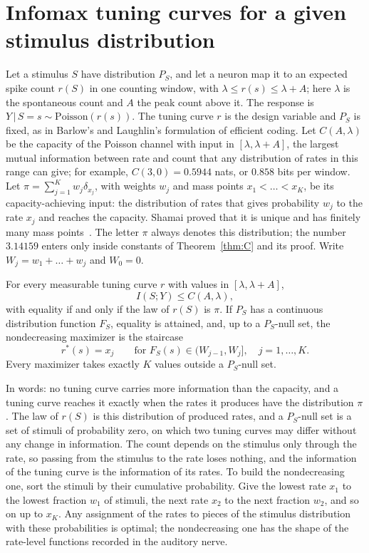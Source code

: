
\section{Infomax tuning curves for a given stimulus distribution}\label{sec:laughlin}

Let a stimulus $S$ have distribution $P_S$, and let a neuron map it to an expected spike count $r(S)$ in one counting window, with
$\lambda\le r(s)\le\lambda+A$; here $\lambda$ is the spontaneous count and $A$ the peak count above it. The response is
$Y\,|\,S=s\sim\mathrm{Poisson}(r(s))$. The tuning curve $r$ is the design variable and $P_S$ is fixed, as in Barlow's and Laughlin's
formulation of efficient coding. Let $C(A,\lambda)$ be the capacity of the Poisson channel with input in $[\lambda,\lambda+A]$, the
largest mutual information between rate and count that any distribution of rates in this range can give; for example,
$C(3,0)=0.5944$ nats, or $0.858$ bits per window. Let
$\pi=\sum_{j=1}^{K}w_j\delta_{x_j}$, with weights $w_j$ and mass points $x_1<\dots<x_K$, be its capacity-achieving input: the
distribution of rates that gives probability $w_j$ to the rate $x_j$ and reaches the capacity. Shamai proved that it is unique and has
finitely many mass points~\cite{Shamai1990}. The letter $\pi$ always denotes this distribution; the number $3.14159$ enters only
inside constants of Theorem~\ref{thm:C} and its proof. Write $W_j=w_1+\dots+w_j$ and $W_0=0$.

\begin{proposition}\label{prop:L1}
For every measurable tuning curve $r$ with values in $[\lambda,\lambda+A]$,
\[
I(S;Y)\le C(A,\lambda),
\]
with equality if and only if the law of $r(S)$ is $\pi$. If $P_S$ has a continuous distribution function $F_S$, equality is attained,
and, up to a $P_S$-null set, the nondecreasing maximizer is the staircase
\[
r^*(s)=x_j\qquad\text{for } F_S(s)\in(W_{j-1},W_j],\quad j=1,\dots,K .
\]
Every maximizer takes exactly $K$ values outside a $P_S$-null set.
\end{proposition}

In words: no tuning curve carries more information than the capacity, and a tuning curve reaches it exactly when the rates it
produces have the distribution $\pi$. The law of $r(S)$ is this distribution of produced rates, and a $P_S$-null set is a set of
stimuli of probability zero, on which two tuning curves may differ without any change in information. The count depends on the
stimulus only through the rate, so passing from the stimulus to the rate loses nothing, and the information of the tuning curve is
the information of its rates. To build the nondecreasing one, sort the stimuli by their cumulative probability. Give the lowest
rate $x_1$ to the lowest fraction $w_1$ of stimuli, the next rate $x_2$ to the next fraction $w_2$, and so on up to $x_K$. Any
assignment of the rates to pieces of the stimulus distribution with these probabilities is optimal; the nondecreasing one has the shape
of the rate-level functions recorded in the auditory nerve.

